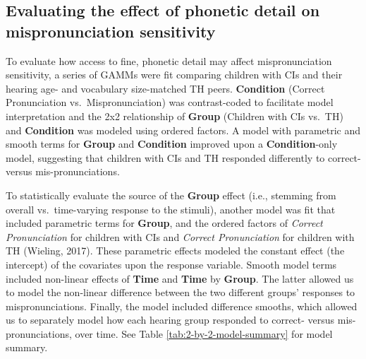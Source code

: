 \documentclass[
]{article}
\begin{document}
\hypertarget{evaluating-the-effect-of-phonetic-detail-on-mispronunciation-sensitivity}{%
\subsection{Evaluating the effect of phonetic detail on mispronunciation sensitivity}\label{evaluating-the-effect-of-phonetic-detail-on-mispronunciation-sensitivity}}

To evaluate how access to fine, phonetic detail may affect mispronunciation sensitivity, a series of GAMMs were fit comparing children with CIs and their hearing age- and vocabulary size-matched TH peers. \textbf{Condition} (Correct Pronunciation vs.~Mispronunciation) was contrast-coded to facilitate model interpretation and the 2x2 relationship of \textbf{Group} (Children with CIs vs.~TH) and \textbf{Condition} was modeled using ordered factors. A model with parametric and smooth terms for \textbf{Group} and \textbf{Condition} improved upon a \textbf{Condition}-only model, suggesting that children with CIs and TH responded differently to correct- versus mis-pronunciations.

To statistically evaluate the source of the \textbf{Group} effect (i.e., stemming from overall vs.~time-varying response to the stimuli), another model was fit that included parametric terms for \textbf{Group}, and the ordered factors of \emph{Correct Pronunciation} for children with CIs and \emph{Correct Pronunciation} for children with TH (Wieling, 2017). These parametric effects modeled the constant effect (the intercept) of the covariates upon the response variable. Smooth model terms included non-linear effects of \textbf{Time} and \textbf{Time} by \textbf{Group}. The latter allowed us to model the non-linear difference between the two different groups' responses to mispronunciations. Finally, the model included difference smooths, which allowed us to separately model how each hearing group responded to correct- versus mis-pronunciations, over time. See Table \ref{tab:2-by-2-model-summary} for model summary.
\end{document}
